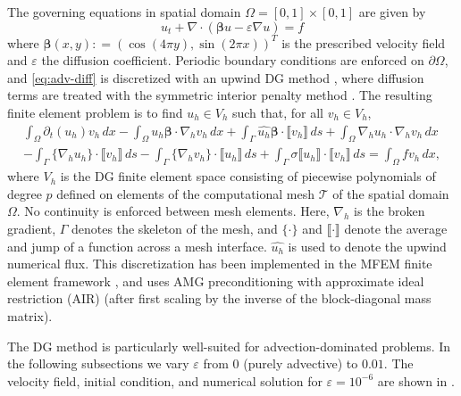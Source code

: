 \documentclass[a4paper,10pt]{article}
\begin{document}
The governing equations in spatial domain $\Omega = [0,1] \times [0,1]$ are given by
\begin{equation} \label{eq:adv-diff}
	u_t + \nabla \cdot ( \bm\beta u  - \varepsilon \nabla u ) = f
\end{equation}
where $\bm\beta(x,y) : = (\cos(4\pi y), \sin(2 \pi x))^T$
is the prescribed velocity field and $\varepsilon$ the diffusion coefficient.
Periodic boundary conditions are enforced on $\partial\Omega$, and
\eqref{eq:adv-diff} is discretized with an upwind DG method \cite{Cockburn2001},
where diffusion terms are treated with the symmetric interior penalty method
\cite{Arnold1982,Arnold2002}. The resulting finite element problem is to find
$u_h \in V_h$ such that, for all $v_h \in V_h$,
\[
	\begin{multlined}
	\int_\Omega \partial_t (u_h) v_h \, dx
	- \int_\Omega u_h \bm\beta \cdot \nabla_h v_h \, dx
	+ \int_\Gamma \widehat{u_h} \bm\beta \cdot \llbracket v_h \rrbracket \, ds
	+ \int_\Omega \nabla_h u_h \cdot \nabla_h v_h \, d x \\
	- \int_\Gamma \{ \nabla_h u_h \} \cdot \llbracket v_h \rrbracket \, ds
	- \int_\Gamma \{ \nabla_h v_h \} \cdot \llbracket u_h \rrbracket \, ds
	+ \int_\Gamma \sigma \llbracket u_h \rrbracket \cdot \llbracket v_h \rrbracket \, ds
	= \int_\Omega f v_h \, dx,
	\end{multlined}
\]
where $V_h$ is the DG finite element space consisting of piecewise polynomials of degree
$p$ defined on elements of the computational mesh $\mathcal{T}$ of the spatial domain
$\Omega$. No continuity is enforced between mesh elements.
Here, $\nabla_h$ is the broken gradient, $\Gamma$ denotes the skeleton of the mesh,
and $\{ \cdot \}$ and $\llbracket \cdot \rrbracket$ denote the average and jump of a
function across a mesh interface.
$\widehat{u_h}$ is used to denote the upwind numerical flux.
This discretization has been implemented in the MFEM finite element framework
\cite{Anderson2020}, and uses AMG preconditioning with approximate ideal restriction
(AIR) \cite{Manteuffel:2019,Manteuffel:2018} (after first scaling by the inverse of the
block-diagonal mass matrix).

The DG method is particularly well-suited for advection-dominated problems.
In the following subsections we vary $\varepsilon$ from $0$ (purely advective) to $0.01$.
The velocity field, initial condition, and numerical solution for $\varepsilon = 10^{-6}$
are shown in .
\end{document}

